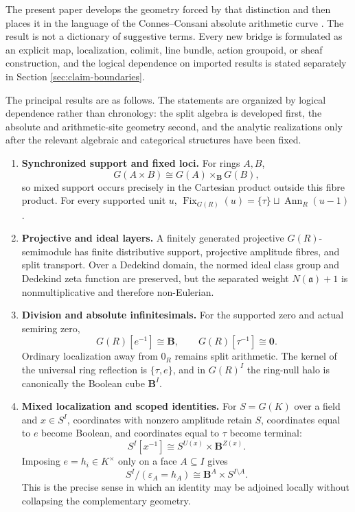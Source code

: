 \documentclass[11pt]{amsart}
\numberwithin{equation}{section}
\theoremstyle{definition}
\newcommand{\B}{\mathbf B}
\newcommand{\zero}{\mathbf 0}
\newcommand{\Ann}{\operatorname{Ann}}
\begin{document}
The present paper develops the geometry forced by that distinction and then
places it in the language of the Connes--Consani absolute arithmetic curve
\cite{CCAbsolute}.  The result is not a dictionary of suggestive terms.
Every new bridge is formulated as an explicit map, localization,
colimit, line bundle, action groupoid, or sheaf construction, and the
logical dependence on imported results is stated separately in Section
\ref{sec:claim-boundaries}.

The principal results are as follows.  The statements are organized by
logical dependence rather than chronology: the split algebra is developed
first, the absolute and arithmetic-site geometry second, and the analytic
realizations only after the relevant algebraic and categorical structures
have been fixed.

\begin{enumerate}[label=\textup{(\arabic*)},leftmargin=3.2em]
\item \textbf{Synchronized support and fixed loci.}
For rings $A,B$,
\[
G(A\times B)\cong G(A)\times_{\B}G(B),
\]
so mixed support occurs precisely in the Cartesian product outside this
fibre product.  For every supported unit $u$,
$\operatorname{Fix}_{G(R)}(u)=\{\tau\}\sqcup\Ann_R(u-1)$.

\item \textbf{Projective and ideal layers.}
A finitely generated projective $G(R)$-semimodule has finite distributive
support, projective amplitude fibres, and split transport.  Over a Dedekind
domain, the normed ideal class group and Dedekind zeta function are
preserved, but the separated weight $N(\mathfrak a)+1$ is
nonmultiplicative and therefore non-Eulerian.
\item \textbf{Division and absolute infinitesimals.}
For the supported zero and actual semiring zero,
\[
G(R)[e^{-1}]\cong\B,
\qquad
G(R)[\tau^{-1}]\cong\zero.
\]
Ordinary localization away from $0_R$ remains split arithmetic.  The kernel
of the universal ring reflection is $\{\tau,e\}$, and in $G(R)^I$ the
ring-null halo is canonically the Boolean cube $\B^I$.

\item \textbf{Mixed localization and scoped identities.}
For $S=G(K)$ over a field and $x\in S^I$, coordinates with nonzero
amplitude retain $S$, coordinates equal to $e$ become Boolean, and
coordinates equal to $\tau$ become terminal:
\[
S^I[x^{-1}]\cong S^{U(x)}\times\B^{Z(x)}.
\]
Imposing $e=h_i\in K^\times$ only on a face $A\subseteq I$ gives
\[
S^I/(\varepsilon_A=h_A)
\cong\B^A\times S^{I\setminus A}.
\]
This is the precise sense in which an identity may be adjoined locally
without collapsing the complementary geometry.


\end{enumerate}
\end{document}
